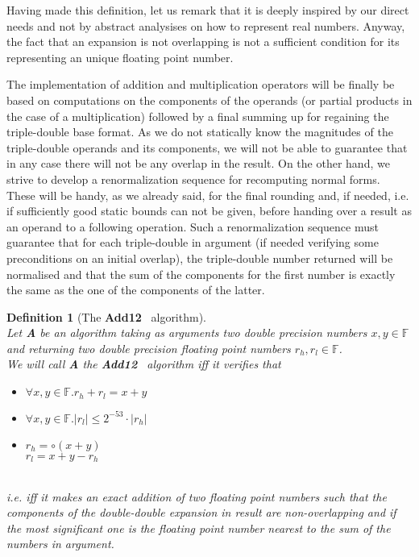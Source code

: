 \documentclass[a4paper,10pt,twoside]{article}
\newtheorem{definition}[theorem]{Definition}
\newcommand{\F}{\ensuremath{\mathbb {F}}}
\newcommand{\hi}{\ensuremath{\mathit{h}}}
\newcommand{\lo}{\ensuremath{\mathit{l}}}
\newcommand{\Add}{{\bf Add12}}
\begin{document}
Having made this definition, let us remark that it is deeply inspired by our
direct needs and not by abstract analysises on how to represent real
numbers. Anyway, the fact that an expansion is not overlapping is not a
sufficient condition for its representing an unique floating point number.\par
The implementation of addition and multiplication operators will be finally be
based on computations on the components of the operands (or partial products
in the case of a multiplication) followed by a final summing up for
regaining the triple-double base format. As we do not statically know the
magnitudes of the triple-double operands and its components, we will not be
able to guarantee that in any case there will not be any overlap in the
result. On the other hand, we strive to develop a renormalization sequence for
recomputing normal forms. These will be handy, as we already said, for the
final rounding and, if needed, i.e. if sufficiently good static bounds can not
be given, before handing over a result as an operand to a following operation. 
Such a renormalization sequence must guarantee that for each triple-double in
argument (if needed verifying some preconditions on an initial overlap), the
triple-double number returned will be normalised and that the sum of the
components for the first number is exactly the same as the one of the
components of the latter.\par
\begin{definition}[The \Add~ algorithm] \label{adddef} ~ \\
Let {\bf A} be an algorithm taking as arguments two double precision numbers $x,y \in \F$ and
returning two double precision floating point numbers $r_\hi, r_\lo \in \F$.\\
We will call {\bf A} the \Add~ algorithm iff it verifies that\\
\begin{itemize}
\item $\forall x,y \in \F. r_\hi + r_\lo = x + y$
\item $\forall x,y \in \F. \left \vert r_\lo \right \vert \leq 2^{-53} \cdot \left \vert r_\hi \right \vert$
\item $r_\hi = \circ\left( x + y \right)$ \\
$r_\lo = x + y - r_\hi$
\end{itemize} ~\\
i.e. iff it makes an exact addition of two floating point numbers such that
the components of the double-double expansion in result are non-overlapping
and if the most significant one is the floating point number nearest to the
sum of the numbers in argument.
\end{definition} 
\end{document}
